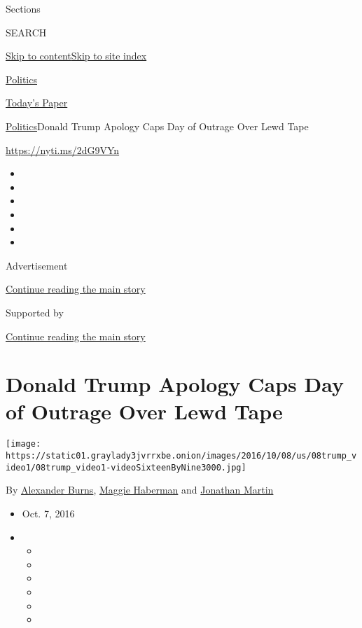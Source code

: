Sections

SEARCH

\protect\hyperlink{site-content}{Skip to
content}\protect\hyperlink{site-index}{Skip to site index}

\href{https://www.nytimes3xbfgragh.onion/section/politics}{Politics}

\href{https://myaccount.nytimes3xbfgragh.onion/auth/login?response_type=cookie\&client_id=vi}{}

\href{https://www.nytimes3xbfgragh.onion/section/todayspaper}{Today's
Paper}

\href{/section/politics}{Politics}\textbar{}Donald Trump Apology Caps
Day of Outrage Over Lewd Tape

\url{https://nyti.ms/2dG9VYn}

\begin{itemize}
\item
\item
\item
\item
\item
\item
\end{itemize}

Advertisement

\protect\hyperlink{after-top}{Continue reading the main story}

Supported by

\protect\hyperlink{after-sponsor}{Continue reading the main story}

\hypertarget{donald-trump-apology-caps-day-of-outrage-over-lewd-tape}{%
\section{Donald Trump Apology Caps Day of Outrage Over Lewd
Tape}\label{donald-trump-apology-caps-day-of-outrage-over-lewd-tape}}

\texttt{[image: https://static01.graylady3jvrrxbe.onion/images/2016/10/08/us/08trump\_video1/08trump\_video1-videoSixteenByNine3000.jpg]}

By \href{http://www.nytimes3xbfgragh.onion/by/alexander-burns}{Alexander
Burns},
\href{http://www.nytimes3xbfgragh.onion/by/maggie-haberman}{Maggie
Haberman} and
\href{http://www.nytimes3xbfgragh.onion/by/jonathan-martin}{Jonathan
Martin}

\begin{itemize}
\item
  Oct. 7, 2016
\item
  \begin{itemize}
  \item
  \item
  \item
  \item
  \item
  \item
  \end{itemize}
\end{itemize}

